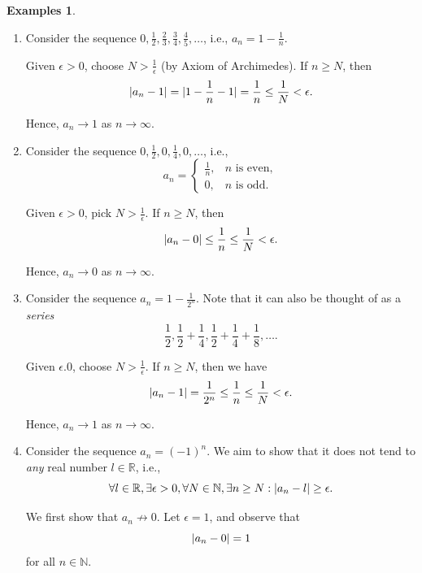 \documentclass{article}
\theoremstyle{definition}
\newtheorem{examples}[theorem]{Examples}
\theoremstyle{remark}
\DeclarePairedDelimiter{\abs}{\lvert}{\rvert}
\newcommand{\pqty}[1]{\left(#1\right)}
\newcommand{\notto}{\not\to}
\newcommand{\NN}{\mathbb{N}}
\newcommand{\RR}{\mathbb{R}}
\begin{document}
\begin{examples}
    \begin{enumerate}
        \item Consider the sequence \(0, \frac{1}{2}, \frac{2}{3}, \frac{3}{4}, \frac{4}{5}, \ldots\), i.e., \(a_n = 1 - \frac{1}{n}\).
        
        Given \(\epsilon > 0\), choose \(N > \frac{1}{\epsilon}\) (by Axiom of Archimedes). If \(n \geq N\), then
        \[
            \abs{a_n - 1} = \abs{1 - \frac{1}{n} - 1} = \frac{1}{n} \leq \frac{1}{N} < \epsilon.
        \]

        Hence, \(a_n \to 1\) as \(n \to \infty\).

        \item Consider the sequence \(0, \frac{1}{2}, 0, \frac{1}{4}, 0, \ldots\), i.e.,
        \[
            a_n = \begin{cases}
                \frac{1}{n}, & n \text{ is even},\\
                0, & n \text{ is odd}.
            \end{cases}
        \]

        Given \(\epsilon > 0\), pick \(N > \frac{1}{\epsilon}\). If \(n \geq N\), then
        \[
            \abs{a_n - 0} \leq \frac{1}{n} \leq \frac{1}{N} < \epsilon.
        \]

        Hence, \(a_n \to 0\) as \(n \to \infty\).

        \item Consider the sequence \(a_n = 1 - \frac{1}{2^n}\). Note that it can also be thought of as a \emph{series}
        \[
            \frac{1}{2}, \frac{1}{2} + \frac{1}{4}, \frac{1}{2} + \frac{1}{4} + \frac{1}{8}, \ldots.  
        \]

        Given \(\epsilon . 0\), choose \(N > \frac{1}{\epsilon}\). If \(n \geq N\), then we have
        \[
            \abs{a_n - 1} = \frac{1}{2^n} \leq \frac{1}{n} \leq \frac{1}{N} < \epsilon.
        \]

        Hence, \(a_n \to 1\) as \(n \to \infty\).

        \item Consider the sequence \(a_n = \pqty{-1}^n\). We aim to show that it does not tend to \emph{any} real number \(l \in \RR\), i.e.,
        \[
            \forall l \in \RR, \exists \epsilon > 0, \forall N \in \NN, \exists n \geq N: \abs{a_n - l} \geq \epsilon.
        \]

        We first show that \(a_n \notto 0\). Let \(\epsilon = 1\), and observe that
        \[
            \abs{a_n - 0} = 1
        \]
        for all \(n \in \NN\).


\end{enumerate}
\end{examples}
\end{document}
